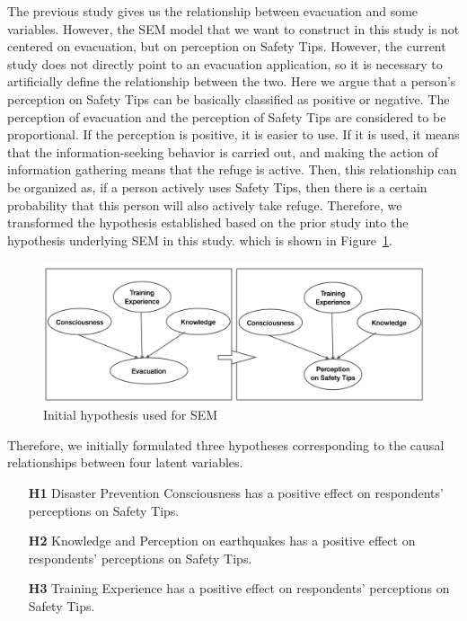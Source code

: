 The previous study gives us the relationship between evacuation and some variables. However, the SEM model that we want to construct in this study is not centered on evacuation, but on perception on Safety Tips. However, the current study does not directly point to an evacuation application, so it is necessary to artificially define the relationship between the two. Here we argue that a person's perception on Safety Tips can be basically classified as positive or negative. The perception of evacuation and the perception of Safety Tips are considered to be proportional. If the perception is positive, it is easier to use. If it is used, it means that the information-seeking behavior is carried out, and making the action of information gathering means that the refuge is active. Then, this relationship can be organized as, if a person actively uses Safety Tips, then there is a certain probability that this person will also actively take refuge. Therefore, we transformed the hypothesis established based on the prior study into the hypothesis underlying SEM in this study. which is shown in Figure~\ref{fig30}.

\begin{figure}[h]
\centering
  \includegraphics[width=\linewidth]{Figure/Figure30.jpg}
  \caption{Initial hypothesis used for SEM}
  \label{fig30}
\end{figure}

Therefore, we initially formulated three hypotheses corresponding to the causal relationships between four latent variables.

\begin{itemize}
\item[\textbf{H1}] Disaster Prevention Consciousness has a positive effect on respondents' perceptions on Safety Tips.
\item[\textbf{H2}] Knowledge and Perception on earthquakes has a positive effect on respondents' perceptions on Safety Tips.
\item[\textbf{H3}] Training Experience has a positive effect on respondents' perceptions on Safety Tips.
\end{itemize}


